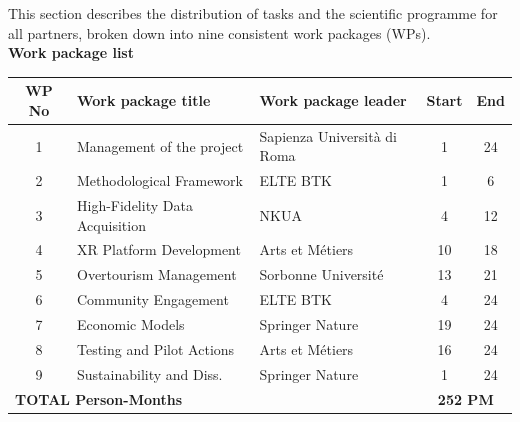 This section describes the distribution of tasks and the scientific programme for all partners, broken down into nine consistent work packages (WPs).\\

\medskip
\textbf{Work package list}
\begin{table}[H]
\centering
\renewcommand{\arraystretch}{1.5} %
\begin{tabularx}{\textwidth}{|c|X|l|c|c|}
\hline
\textbf{WP No} & \textbf{Work package title} & \textbf{Work package leader} & \textbf{Start} & \textbf{End} \\ \hline
1 & Management of the project & Sapienza Università di Roma & 1 & 24 \\ \hline
2 & Methodological Framework & ELTE BTK & 1 & 6 \\ \hline
3 & High-Fidelity Data Acquisition & NKUA & 4 & 12 \\ \hline
4 & XR Platform Development & Arts et Métiers & 10 & 18 \\ \hline
5 & Overtourism Management & Sorbonne Université & 13 & 21 \\ \hline
6 & Community Engagement & ELTE BTK & 4 & 24 \\ \hline
7 & Economic Models & Springer Nature & 19 & 24 \\ \hline
8 & Testing and Pilot Actions & Arts et Métiers & 16 & 24 \\ \hline
9 & Sustainability and Diss. & Springer Nature & 1 & 24 \\ \hline
\multicolumn{3}{|l|}{\textbf{TOTAL Person-Months}} & \multicolumn{2}{c|}{\textbf{252 PM}} \\ \hline
\end{tabularx}
\end{table}











